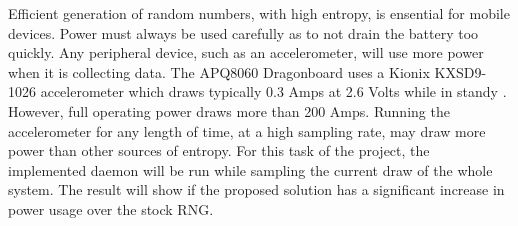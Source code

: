 
Efficient generation of random numbers, with high entropy, is ensential 
for mobile devices.  Power must always be used carefully as to not drain 
the battery too quickly.  Any peripheral device, such as an 
accelerometer, will use more power when it is collecting data.  The 
APQ8060 Dragonboard uses a Kionix KXSD9-1026 accelerometer which draws 
typically 0.3 \mu Amps at 2.6 Volts while in standy \cite{Kionix}.  However, full 
operating power draws more than 200 \mu Amps.  Running the accelerometer 
for any length of time, at a high sampling rate, may draw more power 
than other sources of entropy.  For this task of the project, the 
implemented daemon will be run while sampling the current draw of the 
whole system.  The result will show if the proposed solution has a 
significant increase in power usage over the stock RNG.
